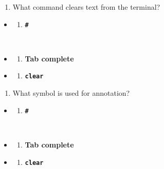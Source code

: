 \documentclass[
  letterpaper,
  DIV=11,
  numbers=noendperiod]{scrreprt}
\providecommand{\tightlist}{%
  \setlength{\itemsep}{0pt}\setlength{\parskip}{0pt}}\usepackage{longtable,booktabs,array}
\begin{document}
\begin{enumerate}
\def\labelenumi{\arabic{enumi}.}
\setcounter{enumi}{1}
\tightlist
\item
  What command clears text from the terminal?
\end{enumerate}

\begin{itemize}
\item
  \begin{enumerate}
  \def\labelenumi{(\Alph{enumi})}
  \tightlist
  \item
    \textbf{\texttt{\#}}\strut \\
  \end{enumerate}
\item
  \begin{enumerate}
  \def\labelenumi{(\Alph{enumi})}
  \setcounter{enumi}{1}
  \tightlist
  \item
    \textbf{Tab complete}\\
  \end{enumerate}
\item
  \begin{enumerate}
  \def\labelenumi{(\Alph{enumi})}
  \setcounter{enumi}{2}
  \tightlist
  \item
    \textbf{\texttt{clear}}
  \end{enumerate}
\end{itemize}

\begin{enumerate}
\def\labelenumi{\arabic{enumi}.}
\setcounter{enumi}{2}
\tightlist
\item
  What symbol is used for annotation?
\end{enumerate}

\begin{itemize}
\item
  \begin{enumerate}
  \def\labelenumi{(\Alph{enumi})}
  \tightlist
  \item
    \textbf{\texttt{\#}}\strut \\
  \end{enumerate}
\item
  \begin{enumerate}
  \def\labelenumi{(\Alph{enumi})}
  \setcounter{enumi}{1}
  \tightlist
  \item
    \textbf{Tab complete}\\
  \end{enumerate}
\item
  \begin{enumerate}
  \def\labelenumi{(\Alph{enumi})}
  \setcounter{enumi}{2}
  \tightlist
  \item
    \textbf{\texttt{clear}}
  \end{enumerate}
\end{itemize}
\end{document}
